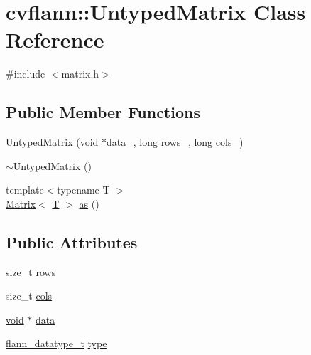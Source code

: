 \hypertarget{classcvflann_1_1UntypedMatrix}{\section{cvflann\-:\-:Untyped\-Matrix Class Reference}
\label{classcvflann_1_1UntypedMatrix}
}


{\ttfamily \#include $<$matrix.\-h$>$}

\subsection*{Public Member Functions}
\begin{DoxyCompactItemize}
\item 
\hyperlink{classcvflann_1_1UntypedMatrix_ab75974470778479556acc8d52e26aea1}{Untyped\-Matrix} (\hyperlink{legacy_8hpp_a8bb47f092d473522721002c86c13b94e}{void} $\ast$data\-\_\-, long rows\-\_\-, long cols\-\_\-)
\item 
\hyperlink{classcvflann_1_1UntypedMatrix_a34943d4daeda55bde85571a1cb332376}{$\sim$\-Untyped\-Matrix} ()
\item 
{\footnotesize template$<$typename T $>$ }\\\hyperlink{classcvflann_1_1Matrix}{Matrix}$<$ \hyperlink{calib3d_8hpp_a3efb9551a871ddd0463079a808916717}{T} $>$ \hyperlink{classcvflann_1_1UntypedMatrix_ab30207331bdc6e88aaae1ed8be9d267b}{as} ()
\end{DoxyCompactItemize}
\subsection*{Public Attributes}
\begin{DoxyCompactItemize}
\item 
size\-\_\-t \hyperlink{classcvflann_1_1UntypedMatrix_aee23a10b03a3130437818835cf8efadc}{rows}
\item 
size\-\_\-t \hyperlink{classcvflann_1_1UntypedMatrix_a69514c412776db84dbd5759c7fb05ddc}{cols}
\item 
\hyperlink{legacy_8hpp_a8bb47f092d473522721002c86c13b94e}{void} $\ast$ \hyperlink{classcvflann_1_1UntypedMatrix_acd79379f70bee713a7c4bbbc2c6f84a4}{data}
\item 
\hyperlink{namespacecvflann_a88c00eb61998ec9fcfba6f9db2987fdb}{flann\-\_\-datatype\-\_\-t} \hyperlink{classcvflann_1_1UntypedMatrix_a3c9f5d57203b9c3faa48207fbc3118f6}{type}
\end{DoxyCompactItemize}


